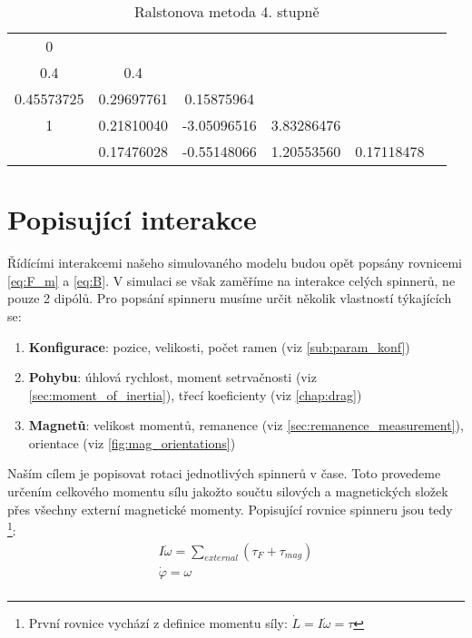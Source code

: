 \documentclass[12pt, a4paper,
 twoside,        %
 openright
]{report}
\begin{document}
\begin{table}[H]
    \hfill
    \parbox{.8\linewidth}{
        \centering
        \caption[Butcherova tabulka Ralstonovy metody 4. stupně]{Ralstonova metoda 4. stupně}
        \begin{tabular}{c | c c c c c}
            0          &                                                    \\
            0.4        & 0.4                                                \\
            0.45573725 & 0.29697761 & 0.15875964                            \\
            1          & 0.21810040 & -3.05096516 & 3.83286476              \\
            \hline
                       & 0.17476028 & -0.55148066 & 1.20553560 & 0.17118478 \\
        \end{tabular}
    }
    \hfill
\end{table}

\section{Popisující interakce}
Řídícími interakcemi našeho simulovaného modelu budou opět popsány rovnicemi \ref{eq:F_m} a \ref{eq:B}. V simulaci se však zaměříme na interakce celých spinnerů, ne pouze 2 dipólů. Pro popsání spinneru musíme určit několik vlastností týkajících se:
\begin{enumerate}[topsep=0pt, partopsep=0pt]
    \setlength{\itemsep}{0pt}%
    \setlength{\parskip}{0pt}%
    \item \textbf{Konfigurace}: pozice, velikosti, počet ramen (viz \autoref{sub:param_konf})
    \item \textbf{Pohybu}: úhlová rychlost, moment setrvačnosti (viz \autoref{sec:moment_of_inertia}), třecí koeficienty (viz \autoref{chap:drag})
    \item \textbf{Magnetů}: velikost momentů, remanence (viz \autoref{sec:remanence_measurement}), orientace (viz \autoref{fig:mag_orientations})
\end{enumerate}

Naším cílem je popisovat rotaci jednotlivých spinnerů v čase. Toto provedeme určením celkového momentu sílu jakožto součtu silových a magnetických složek přes všechny externí magnetické momenty. Popisující rovnice spinneru jsou tedy \footnote{První rovnice vychází z definice momentu síly: $\dot{L} = I \dot{\omega} = \tau$}:
\begin{equation}
    \label{eq:sim_equations}
    \begin{gathered}
        I\dot{\omega} = \sum_{external} (\tau_F + \tau_{mag}) \\
        \dot{\varphi} = \omega \\
    \end{gathered}
\end{equation}
\end{document}

